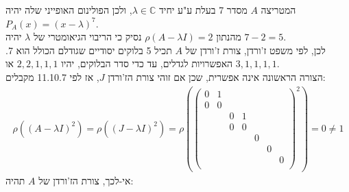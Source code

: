 \documentclass{article}
\def\complex{\mathbb{C}}
\begin{document}
המטריצה $A$ מסדר 7 בעלת ע"ע יחיד $\lambda\in \complex$, ולכן הפולינום האופייני שלה יהיה $P_A(x)=(x-\lambda)^7$.\\
מהנתון $\rho(A-\lambda I)=2$ נסיק כי הריבוי הגיאומטרי של $\lambda$ יהיה $7-2=5$. \\
לכן, לפי משפט ז'ורדן, צורת ז'ורדן של $A$ תכיל 5 בלוקים יסודיים שגודלם הכולל הוא 7. האפשרויות לגדלים, עד כדי סדר הבלוקים, יהיו $2,2,1,1,1$ או $3,1,1,1,1$.\\
הצורה הראשונה אינה אפשרית, שכן אם זוהי צורת הז'ורדן $J$, אז לפי 11.10.7 מקבלים:
\begin{align*}
    \rho((A-\lambda I)^2)=\rho((J-\lambda I)^2)=\rho\left(\begin{pmatrix}
                                                              0 & 1                     \\
                                                              0 & 0                     \\
                                                                &   & 0 & 1             \\
                                                                &   & 0 & 0             \\
                                                                &   &   &   & 0         \\
                                                                &   &   &   &   & 0     \\
                                                                &   &   &   &   &   & 0 \\
                                                          \end{pmatrix}^2\right)=0\ne 1
\end{align*}
אי-לכך, צורת הז'ורדן של $A$ תהיה:
\end{document}
